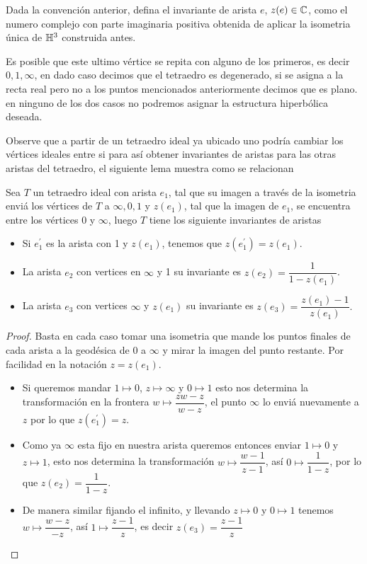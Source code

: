 \begin{definition}
    Dada la convención anterior, defina el invariante de arista $e$, $z(e)\in\mathbb{C}$, como el numero complejo con parte imaginaria positiva obtenida de aplicar la isometria única de $\mathbb{H}^3$ construida antes.
\end{definition}

\begin{note}
    Es posible que este ultimo vértice se repita con alguno de los primeros, es decir $0,1,\infty$, en dado caso decimos que el tetraedro es degenerado, si se asigna a la recta real pero no a los puntos mencionados anteriormente decimos que es plano. en ninguno de los dos casos no podremos asignar la estructura hiperbólica deseada.
\end{note}
Observe que a partir de un tetraedro ideal ya ubicado uno podría cambiar los vértices ideales entre si para así obtener invariantes de aristas para las otras aristas del tetraedro, el siguiente lema muestra como se relacionan
\begin{lemma}
    Sea $T$ un tetraedro ideal con arista $e_1$, tal que su imagen a través de la isometria enviá los vértices de $T$ a $\infty,0,1$ y $z(e_1)$, tal que la imagen de $e_1$, se encuentra entre los vértices 0 y $\infty$, luego $T$ tiene los siguiente invariantes de aristas
    \begin{itemize}
        \item Si $e^\prime_1$ es la arista con 1 y $z(e_1)$, tenemos que $z(e^\prime_1)=z(e_1)$.
        \item La arista $e_2$ con vertices en $\infty$ y 1 su invariante es $z(e_2)=\dfrac{1}{1-z(e_1)}$. 
        \item La arista $e_3$ con vertices $\infty$ y $z(e_1)$ su invariante es $z(e_3)=\dfrac{z(e_1)-1}{z(e_1)}.$
    \end{itemize}
\end{lemma}
\begin{proof}
    Basta en cada caso tomar una isometria que mande los puntos finales de cada arista a la geodésica de $0$ a $\infty$ y mirar la imagen del punto restante. Por facilidad en la notación $z=z(e_1).$ 
    \begin{itemize}
        \item Si queremos mandar $1\mapsto 0$,  $z\mapsto\infty$ y $0\mapsto 1$ esto nos determina la transformación en la frontera $w\mapsto \dfrac{zw-z}{w-z}$, el punto $\infty$ lo enviá nuevamente a $z$ por lo que $z(e_1^\prime)=z.$
        \item Como ya $\infty$ esta fijo en nuestra arista queremos entonces enviar $1\mapsto 0$ y $z\mapsto 1$, esto nos determina la transformación $w\mapsto\dfrac{w-1}{z-1}$, así  $0\mapsto\dfrac{1}{1-z}$, por lo que $z(e_2)=\dfrac{1}{1-z}.$
        \item De manera similar fijando el infinito, y llevando $z\mapsto 0$ y $0\mapsto 1$ tenemos $w\mapsto\dfrac{w-z}{-z}$, así $1\mapsto \dfrac{z-1}{z}$, es decir $z(e_3)=\dfrac{z-1}{z}$
    \end{itemize}
\end{proof}
